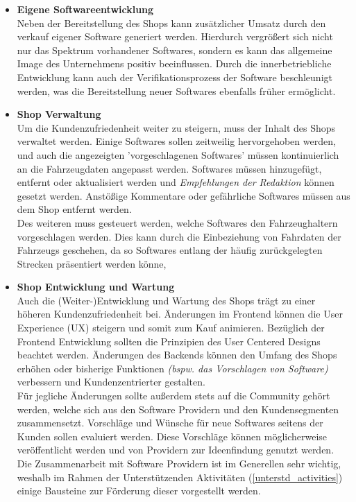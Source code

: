 \begin{itemize}
	\item[] \hspace{-0.6cm} \textbf{Eigene Softwareentwicklung}\\
	Neben der Bereitstellung des Shops kann zusätzlicher Umsatz durch den verkauf eigener Software generiert werden. Hierdurch vergrößert sich nicht nur das Spektrum vorhandener Softwares, sondern es kann das allgemeine Image des Unternehmens positiv beeinflussen. Durch die innerbetriebliche Entwicklung kann auch der Verifikationsprozess der Software beschleunigt werden, was die Bereitstellung neuer Softwares ebenfalls früher ermöglicht.

	\item[] \hspace{-0.6cm}\textbf{Shop Verwaltung}\\
	Um die Kundenzufriedenheit weiter zu steigern, muss der Inhalt des Shops verwaltet werden. Einige Softwares sollen zeitweilig hervorgehoben werden, und auch die angezeigten 'vorgeschlagenen Softwares' müssen kontinuierlich an die Fahrzeugdaten angepasst werden.
	Softwares müssen hinzugefügt, entfernt oder aktualisiert werden und \textit{Empfehlungen der Redaktion} können gesetzt werden. Anstößige Kommentare oder gefährliche Softwares müssen aus dem Shop entfernt werden.\\
	Des weiteren muss gesteuert werden, welche Softwares den Fahrzeughaltern vorgeschlagen werden. Dies kann durch die Einbeziehung von Fahrdaten der Fahrzeugs geschehen, da so Softwares entlang der häufig zurückgelegten Strecken präsentiert werden könne,

	\item[] \hspace{-0.6cm} \textbf{Shop Entwicklung und Wartung}\\
	Auch die (Weiter-)Entwicklung und Wartung des Shops trägt zu einer höheren Kundenzufriedenheit bei. Änderungen im Frontend können die User Experience (UX) steigern und somit zum Kauf animieren. Bezüglich der Frontend Entwicklung sollten die Prinzipien des User Centered Designs beachtet werden. Änderungen des Backends können den Umfang des Shops erhöhen oder bisherige Funktionen \textit{(bspw. das Vorschlagen von Software)} verbessern und Kundenzentrierter gestalten.\\
	Für jegliche Änderungen sollte außerdem stets auf die Community gehört werden, welche sich aus den Software Providern und den Kundensegmenten zusammensetzt. Vorschläge und Wünsche für neue Softwares seitens der Kunden sollen evaluiert werden. Diese Vorschläge können möglicherweise veröffentlicht werden und von Providern  zur Ideenfindung genutzt werden. Die Zusammenarbeit mit Software Providern ist im Generellen sehr wichtig, weshalb im Rahmen der Unterstützenden Aktivitäten (\ref{unterstd_activities}) einige Bausteine zur Förderung dieser vorgestellt werden.	\\
\end{itemize}
